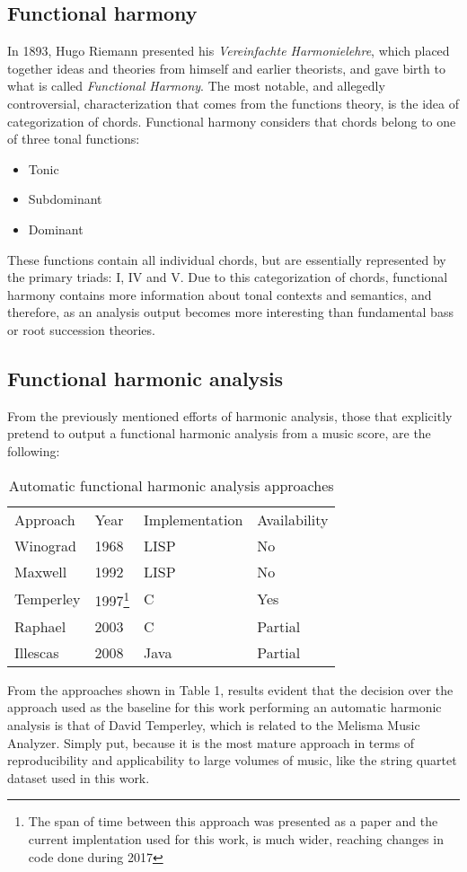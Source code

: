     \subsection{Functional harmony}
    In 1893, Hugo Riemann presented his \emph{Vereinfachte Harmonielehre}, which placed together ideas and theories from himself and earlier theorists, and gave birth to what is called \emph{Functional Harmony}. The most notable, and allegedly controversial, characterization that comes from the functions theory, is the idea of categorization of chords. Functional harmony considers that chords belong to one of three tonal functions:
    \begin{itemize}
      \item Tonic
      \item Subdominant
      \item Dominant
    \end{itemize}
    These functions contain all individual chords, but are essentially represented by the primary triads: I, IV and V.
    Due to this categorization of chords, functional harmony contains more information about tonal contexts and semantics, and therefore, as an analysis output becomes more interesting than fundamental bass or root succession theories.

  \subsection{Functional harmonic analysis}
  From the previously mentioned efforts of harmonic analysis, those that explicitly pretend to output a functional harmonic analysis from a music score, are the following:
  \begin{table}[tbp]
    \centering
    \caption{Automatic functional harmonic analysis approaches}
    \label{my-label}
    \begin{tabular}{llll}
      Approach & Year & Implementation & Availability \\
      Winograd & 1968 & LISP & No \\
      Maxwell & 1992 & LISP & No \\
      Temperley & 1997\footnote{The span of time between this approach was presented as a paper and the current implentation used for this work, is much wider, reaching changes in code done during 2017} & C & Yes \\
      Raphael & 2003 & C & Partial \\
      Illescas & 2008 & Java & Partial
    \end{tabular}
  \end{table}
  From the approaches shown in Table 1, results evident that the decision over the approach used as the baseline for this work performing an automatic harmonic analysis is that of David Temperley, which is related to the Melisma Music Analyzer. Simply put, because it is the most mature approach in terms of reproducibility and applicability to large volumes of music, like the string quartet dataset used in this work.

\newpage
